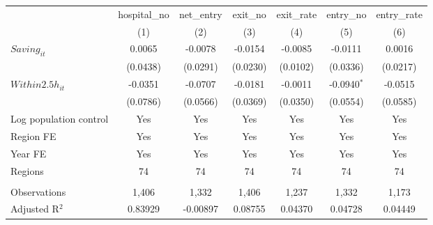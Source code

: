 \begingroup
\centering
\begin{tabular}{lcccccc}
   \toprule
                          & hospital\_no  & net\_entry  & exit\_no  & exit\_rate  & entry\_no     & entry\_rate \\    
                          & (1)           & (2)         & (3)       & (4)         & (5)           & (6)\\  
   \midrule 
   $Saving_{it}$          & 0.0065        & -0.0078     & -0.0154   & -0.0085     & -0.0111       & 0.0016\\   
                          & (0.0438)      & (0.0291)    & (0.0230)  & (0.0102)    & (0.0336)      & (0.0217)\\   
   $Within2.5h_{it}$      & -0.0351       & -0.0707     & -0.0181   & -0.0011     & -0.0940$^{*}$ & -0.0515\\   
                          & (0.0786)      & (0.0566)    & (0.0369)  & (0.0350)    & (0.0554)      & (0.0585)\\   
   Log population control & Yes           & Yes         & Yes       & Yes         & Yes           & Yes\\  
   Region FE              & Yes           & Yes         & Yes       & Yes         & Yes           & Yes\\  
   Year FE                & Yes           & Yes         & Yes       & Yes         & Yes           & Yes\\  
   Regions                & 74            & 74          & 74        & 74          & 74            & 74\\  
    \\
   Observations           & 1,406         & 1,332       & 1,406     & 1,237       & 1,332         & 1,173\\  
   Adjusted R$^2$         & 0.83929       & -0.00897    & 0.08755   & 0.04370     & 0.04728       & 0.04449\\  
   \bottomrule
\end{tabular}
\par\endgroup
